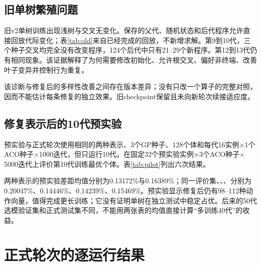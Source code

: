 \documentclass[runningheads,orivec]{llncs}
\begin{document}
\subsection{旧单树繁殖问题}
旧v2单树训练出现浅树与交叉无变化。保存的父代、随机状态和后代程序允许直接回放代际变化；表\ref{tab:old}来自已经完成的回放，不新增求解。第9到10代，三个种子交叉均完全没有改变程序，124个后代中只有21--29个新程序。第12到13代仍有相同现象。该证据解释了为何需要修改初始化、允许根交叉、偏好非终端、改善叶子变异并控制行为重复。
\begin{table}[htbp]\caption{旧v2代际程序回放。所有保存的下一代程序均匹配回放结果。}\label{tab:old}
\centering\small{}\end{table}
该诊断与修复后的多样性改善之间存在版本差异；没有只改一个算子的完整对照，因而不能估计每条修复的独立效果。旧checkpoint保留且未向新轮次续接适应度。

\subsection{修复表示后的10代预实验}
预实验与正式轮次使用相同的两种表示、3个GP种子、128个体和每代16实例$\times$1个ACO种子$\times$1000迭代，但只运行10代。在固定32个预实验实例$\times$3个ACO种子$\times$5000迭代上评价第10代训练最优个体。表\ref{tab:pilot}列出六次结果。
\begin{table}[htbp]\caption{10代预实验，仅使用预实验实例集，不是正式测试结果。}\label{tab:pilot}
\centering\small{}\end{table}
两种表示的预实验差距均值分别为0.13172\%与0.16389\%；同一评价集\FACO{}、\Ueight{}、\Rsixteen{}、\Usixteen{}分别为0.20047\%、0.14446\%、0.14239\%、0.15469\%。预实验显示修复后仍有98--112种动作向量，值得完成更长训练；它没有证明单树在独立测试中稳定占优。后来的50代选模验证集和正式测试集不同，不能用两张表的均值直接计算“多训练40代”的收益。

\section{正式轮次的逐运行结果}
\end{document}
